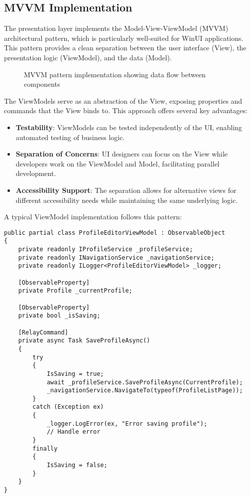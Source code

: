 \subsection{MVVM Implementation}
The presentation layer implements the Model-View-ViewModel (MVVM) architectural pattern, which is particularly well-suited for WinUI applications. This pattern provides a clean separation between the user interface (View), the presentation logic (ViewModel), and the data (Model).

\begin{figure}[h]
\centering
\caption{MVVM pattern implementation showing data flow between components}
\label{fig:mvvm_diagram}
\end{figure}

The ViewModels serve as an abstraction of the View, exposing properties and commands that the View binds to. This approach offers several key advantages:

\begin{itemize}
    \item \textbf{Testability}: ViewModels can be tested independently of the UI, enabling automated testing of business logic.
    \item \textbf{Separation of Concerns}: UI designers can focus on the View while developers work on the ViewModel and Model, facilitating parallel development.
    \item \textbf{Accessibility Support}: The separation allows for alternative views for different accessibility needs while maintaining the same underlying logic.
\end{itemize}

A typical ViewModel implementation follows this pattern:

\begin{verbatim}
public partial class ProfileEditorViewModel : ObservableObject
{
    private readonly IProfileService _profileService;
    private readonly INavigationService _navigationService;
    private readonly ILogger<ProfileEditorViewModel> _logger;
    
    [ObservableProperty]
    private Profile _currentProfile;
    
    [ObservableProperty]
    private bool _isSaving;
    
    [RelayCommand]
    private async Task SaveProfileAsync()
    {
        try
        {
            IsSaving = true;
            await _profileService.SaveProfileAsync(CurrentProfile);
            _navigationService.NavigateTo(typeof(ProfileListPage));
        }
        catch (Exception ex)
        {
            _logger.LogError(ex, "Error saving profile");
            // Handle error
        }
        finally
        {
            IsSaving = false;
        }
    }
}
\end{verbatim}

